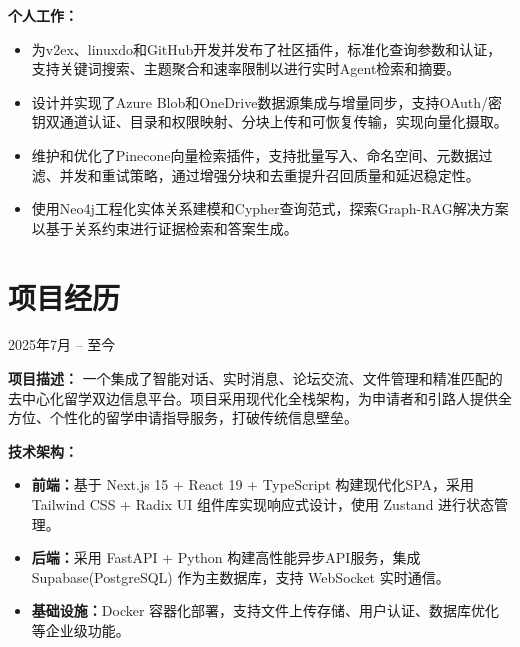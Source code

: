\documentclass{resume}
\begin{document}
\textbf{个人工作：}
\begin{itemize}
    \item 为v2ex、linuxdo和GitHub开发并发布了社区插件，标准化查询参数和认证，支持关键词搜索、主题聚合和速率限制以进行实时Agent检索和摘要。
    \item 设计并实现了Azure Blob和OneDrive数据源集成与增量同步，支持OAuth/密钥双通道认证、目录和权限映射、分块上传和可恢复传输，实现向量化摄取。
    \item 维护和优化了Pinecone向量检索插件，支持批量写入、命名空间、元数据过滤、并发和重试策略，通过增强分块和去重提升召回质量和延迟稳定性。
    \item 使用Neo4j工程化实体关系建模和Cypher查询范式，探索Graph-RAG解决方案以基于关系约束进行证据检索和答案生成。

\end{itemize}

\vspace{-1.8ex}
\section{项目经历}
 {2025年7月 -- 至今}

\textbf{项目描述：}
一个集成了智能对话、实时消息、论坛交流、文件管理和精准匹配的去中心化留学双边信息平台。项目采用现代化全栈架构，为申请者和引路人提供全方位、个性化的留学申请指导服务，打破传统信息壁垒。

\textbf{技术架构：}
\begin{itemize}
    \item \textbf{前端：}基于 Next.js 15 + React 19 + TypeScript 构建现代化SPA，采用 Tailwind CSS + Radix UI 组件库实现响应式设计，使用 Zustand 进行状态管理。
    \item \textbf{后端：}采用 FastAPI + Python 构建高性能异步API服务，集成 Supabase(PostgreSQL) 作为主数据库，支持 WebSocket 实时通信。
    \item \textbf{基础设施：}Docker 容器化部署，支持文件上传存储、用户认证、数据库优化等企业级功能。
\end{itemize}
\end{document}
